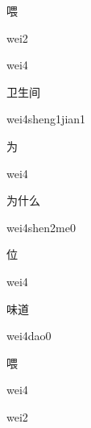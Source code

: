 \begin{multicols*}{2}
\begin{verbete}[wei2]{喂}
\begin{pronuncia}{wei2}
\end{pronuncia}
\begin{pronuncia}{wei4}
\end{pronuncia}
\end{verbete}

\begin{verbete}{卫生间}
\begin{pronuncia}{wei4sheng1jian1}
\end{pronuncia}
\end{verbete}

\begin{verbete}[wei4]{为}
\begin{pronuncia}{wei4}
\end{pronuncia}

\end{verbete}
\begin{verbete}{为什么}
\begin{pronuncia}{wei4shen2me0}
\end{pronuncia}
\end{verbete}

\begin{verbete}[wei4]{位}
\begin{pronuncia}{wei4}
\end{pronuncia}
\end{verbete}

\begin{verbete}{味道}
\begin{pronuncia}{wei4dao0}
\end{pronuncia}
\end{verbete}

\begin{verbete}[wei4]{喂}
\begin{pronuncia}{wei4}
\end{pronuncia}
\begin{pronuncia}{wei2}
\end{pronuncia}
\end{verbete}


\end{multicols*}
